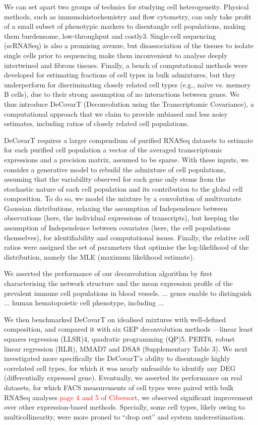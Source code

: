 \documentclass[long, final]{jobim}
\begin{document}
We can set apart two groups of technics for studying cell heterogeneity. Physical methods, such as immunohistochemistry and flow cytometry, can only take profit of a small subset of phenotypic markers to disentangle cell populations, making them burdensome, low-throughput and costly3. Single-cell sequencing (scRNASeq) is also a promising avenue, but disassociation of the tissues to isolate single cells prior to sequencing make them inconvenient to analyse deeply intertwined and fibrous tissues. Finally, a bench of computational methods were developed for estimating fractions of cell types in bulk admixtures, but they underperform for discriminating closely related cell types (e.g., naïve vs. memory B cells), due to their strong assumption of no interactions between genes. We thus introduce DeCovarT (Deconvolution using the Transcriptomic Covariance), a computational approach that we claim to provide unbiased and less noisy estimates, including ratios of closely related cell populations. 


DeCovarT requires a larger compendium of purified RNASeq datasets to estimate for each purified cell population a vector of the averaged transcriptomic expressions and a precision matrix, assumed to be sparse.  With these inputs, we consider a generative model to rebuild the admixture of cell populations, assuming that the variability observed for each gene only stems from the stochastic nature of each cell population and its contribution to the global cell composition. To do so, we model the mixture by a convolution of multivariate Gaussian distributions, relaxing the assumption of Independence between observations (here, the individual expressions of transcripts), but keeping the assumption of Independence between covariates (here, the cell populations themselves), for identifiability and computational issues. Finally, the relative cell ratios were assigned the set of parameters that optimise the log-likelihood of the distribution, namely the MLE (maximum likelihood estimate). 

We asserted the performance of our deconvolution algorithm by first characterising the network structure and the mean expression profile of the prevalent immune cell populations in blood vessels. ... genes enable to distinguish ... human hematopoietic cell phenotype, including ...  

We then benchmarked DeCovarT on idealised mixtures with well-defined composition, and compared it with six GEP deconvolution methods —linear least squares regression (LLSR)4, quadratic programming (QP)5, PERT6, robust linear regression (RLR), MMAD7 and DSA8 (Supplementary Table 3). We next investigated more specifically the DeCovarT’s ability to disentangle highly correlated cell types, for which it was nearly unfeasible to identify any DEG (differentially expressed gene). Eventually, we asserted its performance on real datasets, for which FACS measurements of cell types were paired with bulk RNASeq analyses \textcolor{red}{page 4 and 5 of Cibersort}, we observed significant improvement over  other expression-based methods. Specially, some cell types, likely owing to multicollinearity, were more proned to \enquote{drop out} and system underestimation.  
\end{document}

